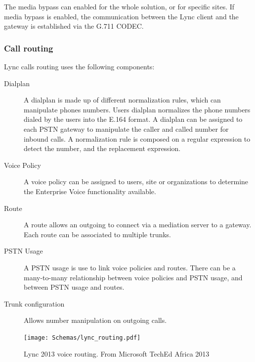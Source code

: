 The media bypass can enabled for the whole solution, or for specific sites. If media bypass is enabled, the communication between the Lync client and the gateway is established via the G.711 CODEC.


\subsubsection{Call routing}
Lync calls routing uses the following components\cite{microsoft_technet_dial_2012}:

\begin{description}
\item[Dialplan] A dialplan is made up of different normalization rules, which can manipulate phones numbers. Users dialplan normalizes the phone numbers dialed by the users into the E.164 format. A dialplan can be assigned to each PSTN gateway to manipulate the caller and called number for inbound calls. A normalization rule is composed on a regular expression to detect the number, and the replacement expression.

\item[Voice Policy] A voice policy can be assigned to users, site or organizations to determine the Enterprise Voice functionality available.

\item[Route] A route allows an outgoing to connect via a mediation server to a gateway. Each route can be associated to multiple trunks.

\item[PSTN Usage] A PSTN usage is use to link voice policies and routes. There can be a many-to-many relationship between voice policies and PSTN usage, and between PSTN usage and routes.

\item[Trunk configuration] Allows number manipulation on outgoing calls.

\end{description}

\begin{figure}[h!]
	\centering
	\texttt{[image: Schemas/lync\_routing.pdf]}
	\caption[Lync 2013 voice routing]{Lync 2013 voice routing. From Microsoft TechEd Africa 2013}
	\label{fig:lync_routing}
\end{figure}







